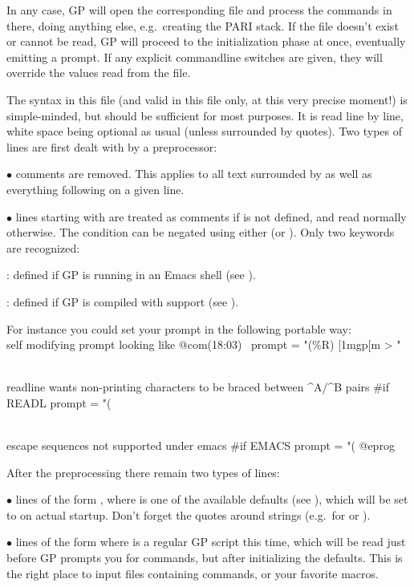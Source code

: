 In any case, GP will open the corresponding file and process the commands in
there,  doing anything else, e.g.~creating the PARI stack. If
the file doesn't exist or cannot be read, GP will proceed to the
initialization phase at once, eventually emitting a prompt. If any explicit
commandline switches are given, they will override the values read from the
 file.

The syntax in this file (and valid in this file only, at this very precise
moment!) is simple-minded, but should be sufficient for most purposes. It
is read line by line, white space being optional as usual (unless surrounded
by quotes). Two types of lines are first dealt with by a preprocessor:

$\bullet$ comments are removed. This applies to all text surrounded by
\kbd{/*~\dots~*/} as well as everything following \kbd{\bs\bs} on a given
line.

$\bullet$ lines starting with   are treated as
comments if  is not defined, and read normally otherwise. The
condition can be negated using either  (or ). Only
two keywords are recognized:

: defined if GP is running in an Emacs shell (see
).

: defined if GP is compiled with  support (see
).

\noindent For instance you could set your prompt in the following portable
way:
\bprog
\\ self modifying prompt looking like @com\hbox{\rm(18:03) \kbd{ >}}
prompt   = "(\%R) \e[1mgp\e[m > "

\\ readline wants non-printing characters to be braced between ^A/^B pairs
#if READL  prompt = "(%

\\ escape sequences not supported under emacs
#if EMACS  prompt = "(%
@eprog

\noindent After the preprocessing there remain two types of lines:

$\bullet$ lines of the form  \kbd{=} , where
 is one of the available defaults (see ),
which will be set to  on actual startup. Don't forget the
quotes around strings (e.g.~for  or ).

$\bullet$ lines of the form  where
 is a regular GP script this time, which will
be read just before GP prompts you for commands, but after initializing the
defaults. This is the right place to input files containing 
commands, or your favorite macros.

